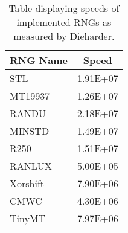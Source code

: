 \begin{table}[tb]
    \caption{Table displaying speeds of implemented RNGs as measured by Dieharder.}
    \label{tab:passesweaksfails}
    \begin{center}
        \begin{tabular}{l|c}
        \hline
        \hline
\textbf{RNG Name} & \textbf{Speed} \\
        \hline
STL       &  1.91E+07  \\
MT19937   &  1.26E+07  \\
RANDU     &  2.18E+07  \\
MINSTD    &  1.49E+07  \\
R250      &  1.51E+07  \\
RANLUX    &  5.00E+05  \\
Xorshift  &  7.90E+06  \\
CMWC      &  4.30E+06  \\
TinyMT    &  7.97E+06  \\

        \hline
        \hline
        \end{tabular}
    \end{center}
\end{table}
